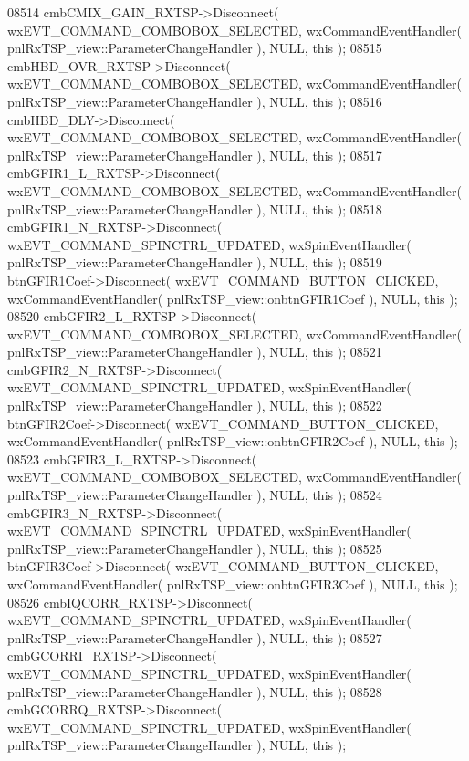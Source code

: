 \begin{DoxyCode}
08514     cmbCMIX_GAIN_RXTSP->Disconnect( wxEVT\_COMMAND\_COMBOBOX\_SELECTED, wxCommandEventHandler( 
      pnlRxTSP_view::ParameterChangeHandler ), NULL, \textcolor{keyword}{this} );
08515     cmbHBD_OVR_RXTSP->Disconnect( wxEVT\_COMMAND\_COMBOBOX\_SELECTED, wxCommandEventHandler( 
      pnlRxTSP_view::ParameterChangeHandler ), NULL, \textcolor{keyword}{this} );
08516     cmbHBD_DLY->Disconnect( wxEVT\_COMMAND\_COMBOBOX\_SELECTED, wxCommandEventHandler( 
      pnlRxTSP_view::ParameterChangeHandler ), NULL, \textcolor{keyword}{this} );
08517     cmbGFIR1_L_RXTSP->Disconnect( wxEVT\_COMMAND\_COMBOBOX\_SELECTED, wxCommandEventHandler( 
      pnlRxTSP_view::ParameterChangeHandler ), NULL, \textcolor{keyword}{this} );
08518     cmbGFIR1_N_RXTSP->Disconnect( wxEVT\_COMMAND\_SPINCTRL\_UPDATED, wxSpinEventHandler( 
      pnlRxTSP_view::ParameterChangeHandler ), NULL, \textcolor{keyword}{this} );
08519     btnGFIR1Coef->Disconnect( wxEVT\_COMMAND\_BUTTON\_CLICKED, wxCommandEventHandler( 
      pnlRxTSP_view::onbtnGFIR1Coef ), NULL, \textcolor{keyword}{this} );
08520     cmbGFIR2_L_RXTSP->Disconnect( wxEVT\_COMMAND\_COMBOBOX\_SELECTED, wxCommandEventHandler( 
      pnlRxTSP_view::ParameterChangeHandler ), NULL, \textcolor{keyword}{this} );
08521     cmbGFIR2_N_RXTSP->Disconnect( wxEVT\_COMMAND\_SPINCTRL\_UPDATED, wxSpinEventHandler( 
      pnlRxTSP_view::ParameterChangeHandler ), NULL, \textcolor{keyword}{this} );
08522     btnGFIR2Coef->Disconnect( wxEVT\_COMMAND\_BUTTON\_CLICKED, wxCommandEventHandler( 
      pnlRxTSP_view::onbtnGFIR2Coef ), NULL, \textcolor{keyword}{this} );
08523     cmbGFIR3_L_RXTSP->Disconnect( wxEVT\_COMMAND\_COMBOBOX\_SELECTED, wxCommandEventHandler( 
      pnlRxTSP_view::ParameterChangeHandler ), NULL, \textcolor{keyword}{this} );
08524     cmbGFIR3_N_RXTSP->Disconnect( wxEVT\_COMMAND\_SPINCTRL\_UPDATED, wxSpinEventHandler( 
      pnlRxTSP_view::ParameterChangeHandler ), NULL, \textcolor{keyword}{this} );
08525     btnGFIR3Coef->Disconnect( wxEVT\_COMMAND\_BUTTON\_CLICKED, wxCommandEventHandler( 
      pnlRxTSP_view::onbtnGFIR3Coef ), NULL, \textcolor{keyword}{this} );
08526     cmbIQCORR_RXTSP->Disconnect( wxEVT\_COMMAND\_SPINCTRL\_UPDATED, wxSpinEventHandler( 
      pnlRxTSP_view::ParameterChangeHandler ), NULL, \textcolor{keyword}{this} );
08527     cmbGCORRI_RXTSP->Disconnect( wxEVT\_COMMAND\_SPINCTRL\_UPDATED, wxSpinEventHandler( 
      pnlRxTSP_view::ParameterChangeHandler ), NULL, \textcolor{keyword}{this} );
08528     cmbGCORRQ_RXTSP->Disconnect( wxEVT\_COMMAND\_SPINCTRL\_UPDATED, wxSpinEventHandler( 
      pnlRxTSP_view::ParameterChangeHandler ), NULL, \textcolor{keyword}{this} );

\end{DoxyCode}
